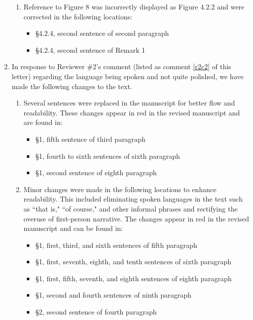 \documentclass[11pt,letterpaper]{report}
\begin{document}
\begin{enumerate}[label=\textit{Mc.\arabic*}]
\begin{enumerate}[label=\textit{Mc.3.\roman*}]
\item  Reference to Figure 8 was incorrectly displayed as Figure 4.2.2  and were corrected in the following locations:
\begin{itemize}
        \item \S4.2.4, second sentence of second paragraph
        \item \S4.2.4, second sentence of Remark 1
    \end{itemize}
\end{enumerate}
%
\item \label{a4} In response to Reviewer \#2's comment (listed as comment \ref{r2c2} of this letter) regarding the language being spoken and not quite polished, we  have made the following changes to the text.
\begin{enumerate}[label=\textit{Mc.4.\roman*}]
    \item Several sentences were replaced in the manuscript for better flow and readability. These changes appear in red in the revised manuscript and are found in:
    \begin{itemize}
        \item \S1, fifth sentence of third paragraph
        \item \S1, fourth to sixth sentences of sixth paragraph
        \item \S1, second sentence of eighth paragraph
    \end{itemize}
    \item  Minor changes were made in the following locations to enhance readability. This included eliminating spoken languages in the text such as ``that is," ``of course," and other informal phrases  and rectifying the overuse of first-person narrative. The changes appear in red in the revised manuscript and can be found in:
    \begin{itemize}
        \item \S1, first, third, and sixth sentences of fifth paragraph
        \item \S1, first, seventh, eighth, and tenth sentences of sixth paragraph
        \item \S1, first, fifth, seventh, and eighth sentences of eighth paragraph
        \item \S1, second and fourth sentences of ninth paragraph
        \item \S2, second sentence of fourth paragraph

\end{itemize}
\end{enumerate}
\end{enumerate}
\end{document}
